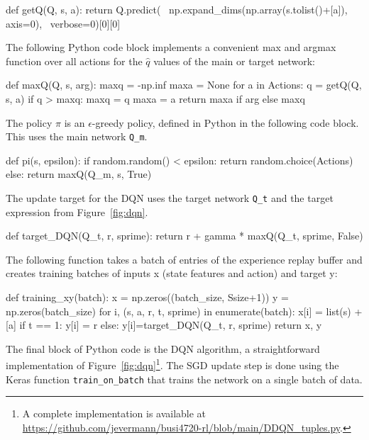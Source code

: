 \begin{withcode}
\begin{pythoncode}
def getQ(Q, s, a):
    return Q.predict( \
        np.expand_dims(np.array(s.tolist()+[a]), axis=0), \
        verbose=0)[0][0]
\end{pythoncode}

The following Python code block implements a convenient max and argmax function over all actions for the $\hat{q}$ values of the main or target network:

\begin{pythoncode}
def maxQ(Q, s, arg):
    maxq = -np.inf
    maxa = None
    for a in Actions:
        q = getQ(Q, s, a)
        if q > maxq:
            maxq = q
            maxa = a
    return maxa if arg else maxq
\end{pythoncode}

The policy $\pi$ is an $\epsilon$-greedy policy, defined in Python in the following code block. This uses the main network \texttt{Q\_m}.

\begin{pythoncode}
def pi(s, epsilon):
    if random.random() < epsilon:
        return random.choice(Actions)
    else:
        return maxQ(Q_m, s, True)
\end{pythoncode}

The update target for the DQN uses the target network \texttt{Q\_t} and the target expression from Figure~\ref{fig:dqn}. 

\begin{pythoncode}
def target_DQN(Q_t, r, sprime):
    return r + gamma * maxQ(Q_t, sprime, False)
\end{pythoncode}

The following function takes a batch of entries of the experience replay buffer and creates training batches of inputs x (state features and action) and target y:

\begin{pythoncode}
def training_xy(batch):
    x = np.zeros((batch_size, Ssize+1))
    y = np.zeros(batch_size)
    for i, (s, a, r, t, sprime) in enumerate(batch):
        x[i] = list(s) + [a]
        if t == 1:
            y[i] = r
        else:
            y[i]=target_DQN(Q_t, r, sprime)
    return x, y
\end{pythoncode}

The final block of Python code is the DQN algorithm, a straightforward implementation of Figure~\ref{fig:dqn}\footnote{A complete implementation is available at \url{https://github.com/jevermann/busi4720-rl/blob/main/DDQN_tuples.py}.}. The SGD update step is done using the Keras function \texttt{train\_on\_batch} that trains the network on a single batch of data.


\end{withcode}
